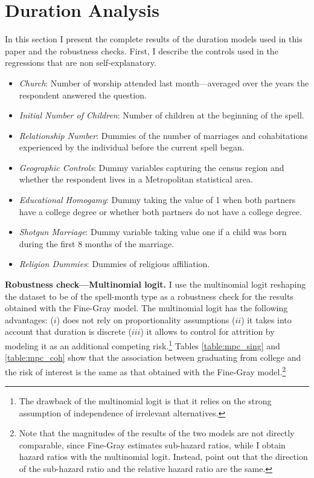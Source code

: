 \documentclass[12pt]{article}
\begin{document}
\section{Duration Analysis}\label{subsection:duration}
In this section I present the complete results of the duration models used in this paper and the robustness checks. First, I describe the controls used in the regressions that are non self-explanatory.
\begin{itemize}
  \setlength{\itemsep}{1pt}
\setlength{\parskip}{0pt}
\setlength{\parsep}{0pt}
\item \textit{Church}: Number of worship attended last month---averaged over the years the respondent answered the question.
\item \textit{Initial Number of Children}: Number of children at the beginning of the spell. 
\item \textit{Relationship Number}: Dummies of the number of marriages and cohabitations experienced by the individual before the current spell began.
\item \textit{Geographic Controls}: Dummy variables capturing the census region and whether the respondent lives in a Metropolitan statistical area.
\item \textit{Educational Homogamy}: Dummy taking the value of 1 when both partners have a college degree or whether both partners do not have a college degree.
\item \textit{Shotgun Marriage}: Dummy variable taking value one if a child was born during the first 8 months of the marriage.
\item \textit{Religion Dummies}: Dummies of religious affiliation.
\end{itemize} 
 \textbf{Robustness check---Multinomial logit.} I use the multinomial logit reshaping the dataset to be of the spell-month type as a robustness check for the results obtained with the Fine-Gray model. The multinomial logit has the following advantages: ($i$) does not rely on proportionality assumptions ($ii$) it takes into account that duration is discrete ($iii$) it allows to control for attrition by modeling it as an additional competing risk.\footnote{The drawback of the multinomial logit is that it relies on the strong assumption of independence of irrelevant alternatives.} Tables \ref{table:mpc_sing} and \ref{table:mpc_coh} show that the association between graduating from college and the risk of interest is the same as that obtained with the Fine-Gray model.\footnote{Note that the magnitudes of the results of the two models are not directly comparable, since Fine-Gray estimates sub-hazard ratios, while I obtain hazard ratios with the multinomial logit. Instead, \cite{austin2017} point out that the direction of the sub-hazard ratio and the relative hazard ratio are the same.} \\
\end{document}
